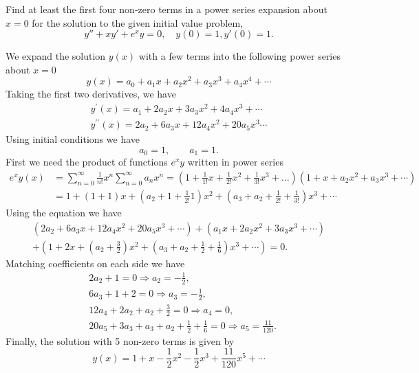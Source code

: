 \documentclass[11pt]{article}
\begin{document}
\begin{problem}
Find at least the first four non-zero terms in a power series expansion about $x=0$ for the solution to the given initial value problem,
\begin{equation*}
y'' + x y' + e^{x} y =0, \quad y(0) =1, y'(0)=1.
\end{equation*}
\end{problem}
\begin{solution}
We expand the solution $y(x)$ with a few terms into the following power series about $x=0$
\begin{equation*}
y(x) =  a_{0} + a_{1}x + a_{2}x^{2} + a_{3}x^{3} + a_{4}x^{4}+\cdots 
\end{equation*}
Taking the first two derivatives, we have
\begin{gather*}
y^{\prime}(x) =  a_{1} + 2a_{2}x + 3a_{3}x^{2} + 4a_{4}x^{3}+\cdots \\
y^{\prime \prime}(x) = 2a_{2} + 6a_{3}x + 12a_{4}x^{2}+ 20a_{5}x^{3}\cdots 
\end{gather*}
Using initial conditions we have
\begin{equation}
a_{0}=1,\qquad a_{1} = 1.
\end{equation}
First we need the product of functions $e^{x}y$ written in power series
\begin{align*}
e^{x}y(x) &= \sum_{n=0}^{\infty}\frac{1}{n!}x^{n} \sum_{n=0}^{\infty}a_{n}x^{n} = \left(1 + \frac{1}{1!}x + \frac{1}{2!}x^{2} + \frac{1}{3!}x^{3} + \dots\right)\left(1 + x + a_{2}x^{2} + a_{3}x^{3}+ \cdots\right) \\
          &= 1 + (1 + 1)x + \left(a_{2}+ 1 + \frac{1}{2!}1\right)x^{2} + \left(a_{3} + a_{2} + \frac{1}{2!} + \frac{1}{3!}\right)x^{3}+ \cdots
\end{align*}
Using the equation we have
\begin{multline*}
(2a_{2} + 6a_{3}x + 12a_{4}x^{2} + 20a_{5}x^{3} + \cdots ) + (a_{1}x + 2a_{2}x^{2} + 3a_{3}x^{3} +\cdots) \\+ (1 + 2x + (a_{2}+ \tfrac{3}{2})x^{2}+ (a_{3} + a_{2} + \tfrac{1}{2} + \tfrac{1}{6})x^{3} + \cdots) = 0.
\end{multline*}
Matching coefficients on each side we have
\begin{align*}
& 2a_{2} + 1= 0 \Rightarrow a_{2}=-\frac{1}{2}, \\
& 6a_{3} + 1  + 2 =0 \Rightarrow a_{3}=-\frac{1}{2}, \\
& 12a_{4} + 2a_{2}  + a_{2} +\frac{3}{2} =0 \Rightarrow a_{4}= 0, \\
& 20a_{5} + 3a_{3}  + a_{3} + a_{2} +\frac{1}{2} + \frac{1}{6} =0 \Rightarrow a_{5}= \frac{11}{120}.
\end{align*}
Finally, the solution with 5 non-zero terms is given by
\begin{equation*}
\boxed{y(x)= 1 + x -\frac{1}{2}x^{2} -\frac{1}{2}x^{3} + \frac{11}{120}x^{5} + \cdots}
\end{equation*}

\end{solution}
\end{document}
